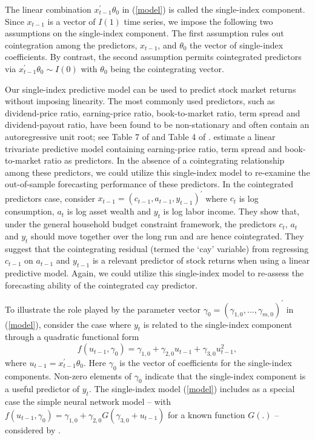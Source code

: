 \documentclass[a4paper,12pt,times,numbered,print,index]{report}
\numberwithin{equation}{section}
\begin{document}
	The linear combination $x_{t-1}^{\prime }\theta _{0}$ in (\ref{model}) is
	called the single-index component. Since $x_{t-1}$ is a vector of $I(1)$ time series, we impose the following two assumptions on the single-index component. The first assumption rules out cointegration among the predictors, $x_{t-1}$, and $\theta_{0}$ the vector of
	single-index coefficients. By contrast, the second assumption permits cointegrated predictors via $x_{t-1}^{\prime }\theta _{0}\sim
	I\left( 0\right) $ with $\theta _{0}$ being the cointegrating vector. 
	
	Our single-index predictive model can be used to predict stock market returns without imposing linearity. The most commonly used predictors, such as dividend-price ratio, earning-price ratio, book-to-market ratio, term spread and dividend-payout ratio, have been found to be non-stationary and often contain an autoregressive unit root; see Table 7 of \cite{kostakis2015robust} and Table 4 of \cite{campbell2006efficient}. \cite{campbell2004caught} estimate a linear trivariate predictive model containing earning-price ratio, term spread and book-to-market ratio as predictors. In the absence of a cointegrating relationship among these predictors, we could utilize this single-index model to re-examine the out-of-sample forecasting performance of these predictors. In the cointegrated predictors case, \cite{lettau2001consumption} consider $x_{t-1}=\left( c_{t-1},a_{t-1},y_{t-1}\right)^{\prime }$ where $c_{t}$ is log
	consumption, $a_{t}$ is log asset wealth and $y_{t}$ is log labor income. They show that, under the general household budget constraint framework, the predictors $c_{t}$, $a_{t}$ and $y_{t}$ should move together over the long run and are hence cointegrated. They suggest that the cointegrating residual (termed the `cay' variable) from regressing $c_{t-1}$ on $a_{t-1}$ and $y_{t-1}$ is a relevant predictor of stock returns when using a linear predictive model. Again, we could utilize this single-index model to re-assess the forecasting ability of the cointegrated cay predictor. 
	
	
	To illustrate the role played by the parameter vector $\gamma _{0}=\left( \gamma
	_{1,0},...,\gamma _{m,0}\right) ^{\prime }$ in (\ref{model}), consider the
	case where $y_{t}$ is related to the single-index component through a
	quadratic functional form%
	\[
	f\left( u_{t-1},\gamma _{0}\right) =\gamma _{1,0}+\gamma
	_{2,0}u_{t-1}+\gamma _{3,0}u_{t-1}^{2},
	\]%
	where $u_{t-1}=x_{t-1}^{\prime }\theta _{0}.$ Here $\gamma _{0}$ is the
	vector of coefficients for the single-index components. Non-zero elements of 
	$\gamma _{0}$ indicate that the single-index component is a useful predictor of $y_{t}$. The single-index model (\ref{model}) includes as a special case the simple neural network model -- with $f\left( u_{t-1},\gamma _{0}\right) =\gamma _{1,0}+\gamma _{2,0}G\left(
	\gamma _{3,0}+u_{t-1}\right) $ for a known function $G\left( .\right) $ -- considered by \cite{chang2003index}. 
	
\end{document}
